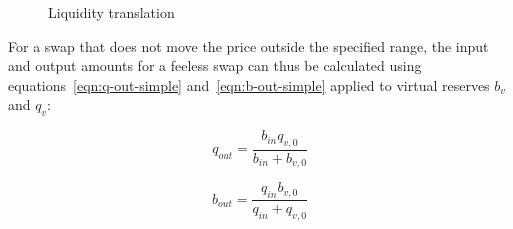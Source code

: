 \documentclass[table, twocolumn]{article}
\begin{document}
\begin{figure}[ht]
  \centering
  
  \caption{Liquidity translation}
  \label{fig:liquidity-translation}
\end{figure}

For a swap that does not move the price outside the specified range, the input and output amounts
for a feeless swap can thus be calculated using equations~\ref{eqn:q-out-simple}
and~\ref{eqn:b-out-simple} applied to virtual reserves $b_v$ and $q_v$:

\begin{equation}
  q_{out} = \frac{b_{in} q_{v, 0}}{b_{in} + b_{v, 0}}
\end{equation}

\begin{equation}
  b_{out} = \frac{q_{in} b_{v, 0}}{q_{in} + q_{v, 0}}
\end{equation}
\end{document}
